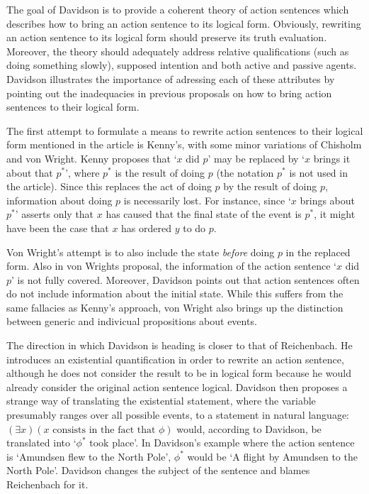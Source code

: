 \documentclass{article}
\begin{document}
\maketitle

The goal of Davidson is to provide a coherent theory of action sentences which
describes how to bring an action sentence to its logical form. Obviously,
rewriting an action sentence to its logical form should preserve its truth
evaluation. Moreover, the theory should adequately address relative 
qualifications (such as doing something slowly), supposed intention and
both active and passive agents. Davidson illustrates the importance of adressing
each of these attributes by pointing out the inadequacies in previous
proposals on how to bring action sentences to their logical form.

The first attempt to formulate a means to rewrite action sentences to their
logical form mentioned in the article is Kenny's, with some minor variations of
Chisholm and von Wright. Kenny proposes that `$x$ did $p$' may be replaced by
`$x$ brings it about that $p^*$', where $p^*$ is the result of doing $p$ (the
notation $p^*$ is not used in the article). Since this replaces
the act of doing $p$ by the result of doing $p$, information about doing $p$
is necessarily lost. For instance, since `$x$ brings about $p^*$' asserts only 
that $x$ has caused that the final state of the event is $p^*$, it might have
been the case that $x$ has ordered $y$ to do $p$. 

Von Wright's attempt is to also include the state
\emph{before} doing $p$ in the replaced form. Also in von Wrights proposal, the
information of the action sentence `$x$ did $p$' is not fully covered. Moreover,
Davidson points out that action sentences often do not include information
about the initial state. While this suffers from the same fallacies as Kenny's
approach, von Wright also brings up the distinction between generic and
indivicual propositions about events.

The direction in which Davidson is heading is closer to that of Reichenbach. He
introduces an existential quantification in order to rewrite an action sentence,
although he does not consider the result to be in logical form because he would
already consider the original action sentence logical. Davidson then proposes
a strange way of translating the existential statement, where the variable
presumably ranges over all possible events, to a statement in natural language:
$(\exists x)(x\text{ consists in the fact that }\phi)$ would, according to
Davidson, be translated into `$\phi^*$ took place'. In Davidson's example where
the action sentence is `Amundsen flew to the North Pole', $\phi^*$ would be
`A flight by Amundsen to the North Pole'. Davidson changes the
subject of the sentence and blames Reichenbach for it.
\end{document}
